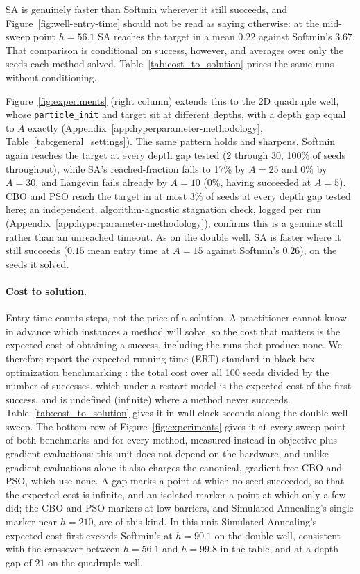 \documentclass{article} %
\theoremstyle{plain}
\theoremstyle{definition}
\theoremstyle{remark}
\begin{document}
SA is genuinely faster than Softmin wherever it still succeeds, and Figure~\ref{fig:well-entry-time} should not be read as saying otherwise: at the mid-sweep point $h=56.1$ SA reaches the target in a mean $0.22$ against Softmin's $3.67$. That comparison is conditional on success, however, and averages over only the seeds each method solved. Table~\ref{tab:cost_to_solution} prices the same runs without conditioning.

Figure~\ref{fig:experiments} (right column) extends this to the 2D quadruple well, whose \texttt{particle\_init} and target sit at different depths, with a depth gap equal to $A$ exactly (Appendix~\ref{app:hyperparameter-methodology}, Table~\ref{tab:general_settings}). The same pattern holds and sharpens. Softmin again reaches the target at every depth gap tested (2 through 30, 100\% of seeds throughout), while SA's reached-fraction falls to 17\% by $A=25$ and 0\% by $A=30$, and Langevin fails already by $A=10$ (0\%, having succeeded at $A=5$). CBO and PSO reach the target in at most 3\% of seeds at every depth gap tested here; an independent, algorithm-agnostic stagnation check, logged per run (Appendix~\ref{app:hyperparameter-methodology}), confirms this is a genuine stall rather than an unreached timeout. As on the double well, SA is faster where it still succeeds ($0.15$ mean entry time at $A=15$ against Softmin's $0.26$), on the seeds it solved.

\paragraph{Cost to solution.} Entry time counts steps, not the price of a solution. A practitioner cannot know in advance which instances a method will solve, so the cost that matters is the expected cost of obtaining a success, including the runs that produce none. We therefore report the expected running time (ERT) standard in black-box optimization benchmarking \citep{hansen2016coco}: the total cost over all 100 seeds divided by the number of successes, which under a restart model is the expected cost of the first success, and is undefined (infinite) where a method never succeeds. Table~\ref{tab:cost_to_solution} gives it in wall-clock seconds along the double-well sweep. The bottom row of Figure~\ref{fig:experiments} gives it at every sweep point of both benchmarks and for every method, measured instead in objective plus gradient evaluations: this unit does not depend on the hardware, and unlike gradient evaluations alone it also charges the canonical, gradient-free CBO and PSO, which use none. A gap marks a point at which no seed succeeded, so that the expected cost is infinite, and an isolated marker a point at which only a few did; the CBO and PSO markers at low barriers, and Simulated Annealing's single marker near $h=210$, are of this kind. In this unit Simulated Annealing's expected cost first exceeds Softmin's at $h=90.1$ on the double well, consistent with the crossover between $h=56.1$ and $h=99.8$ in the table, and at a depth gap of $21$ on the quadruple well.
\end{document}
